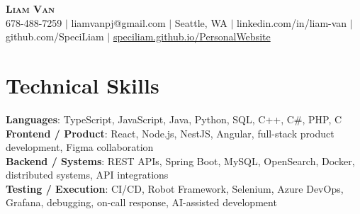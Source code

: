 \documentclass[letterpaper,11pt]{article}
\begin{document}

%
\begin{center}
    \textbf{\Huge \scshape Liam Van} \\ \vspace{1pt}
    \small 678-488-7259 $|$ \small {liamvanpj@gmail.com} $|$ Seattle, WA
 {{$|$ linkedin.com/in/liam-van} {$|$ github.com/SpeciLiam} {$|$ \href{https://speciliam.github.io/PersonalWebsite}{speciliam.github.io/PersonalWebsite}}}

\end{center}

\section{Technical Skills}
 \begin{itemize}[leftmargin=0.15in, label={}]
    \small{\item{
     \textbf{Languages}{: TypeScript, JavaScript, Java, Python, SQL, C++, C\#, PHP, C} \\
     \textbf{Frontend / Product}{: React, Node.js, NestJS, Angular, full-stack product development, Figma collaboration} \\
     \textbf{Backend / Systems}{: REST APIs, Spring Boot, MySQL, OpenSearch, Docker, distributed systems, API integrations} \\
     \textbf{Testing / Execution}{: CI/CD, Robot Framework, Selenium, Azure DevOps, Grafana, debugging, on-call response, AI-assisted development} \\
    }}
 \end{itemize}
%
\end{document}

